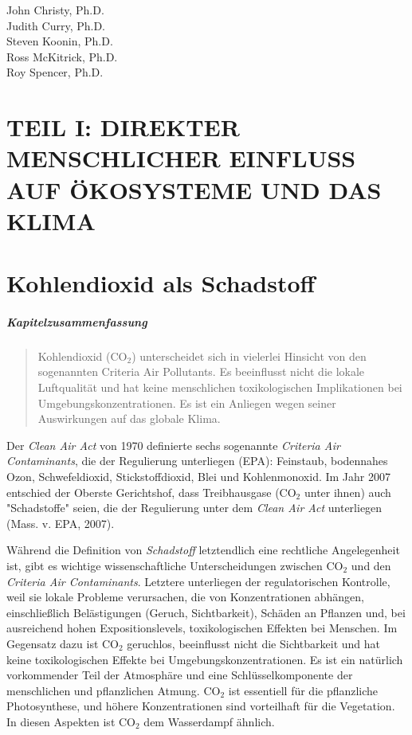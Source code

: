 \documentclass[12pt,paper=a4,DIV=12,parskip=never,chapterprefix=false,headings=standardclasses]{scrreprt}
\numberwithin{figure}{chapter}
\begin{document}
\noindent
John Christy, Ph.D.\\[1em]
Judith Curry, Ph.D.\\[1em]
Steven Koonin, Ph.D.\\[1em]
Ross McKitrick, Ph.D.\\[1em]
Roy Spencer, Ph.D.

\cleardoublepage
\chapter*{TEIL I: DIREKTER MENSCHLICHER EINFLUSS AUF ÖKOSYSTEME UND DAS KLIMA}
\cleardoublepage
{}
\chapter{Kohlendioxid als Schadstoff}
\paragraph{Kapitelzusammenfassung}
\begin{quote}
Kohlendioxid (CO$_2$) unterscheidet sich in vielerlei Hinsicht von den sogenannten Criteria Air Pollutants. Es beeinflusst nicht die lokale Luftqualität und hat keine menschlichen toxikologischen Implikationen bei Umgebungskonzentrationen. Es ist ein Anliegen wegen seiner Auswirkungen auf das globale Klima.
\end{quote}

Der \emph{Clean Air Act} von 1970 definierte sechs sogenannte \emph{Criteria Air Contaminants}, die der Regulierung unterliegen (EPA): Feinstaub, bodennahes Ozon, Schwefeldioxid, Stickstoffdioxid, Blei und Kohlenmonoxid. Im Jahr 2007 entschied der Oberste Gerichtshof, dass Treibhausgase (CO$_2$ unter ihnen) auch "Schadstoffe" seien, die der Regulierung unter dem \emph{Clean Air Act} unterliegen (Mass. v. EPA, 2007).

Während die Definition von \emph{Schadstoff} letztendlich eine rechtliche Angelegenheit ist, gibt es wichtige wissenschaftliche Unterscheidungen zwischen CO$_2$ und den \emph{Criteria Air Contaminants}. Letztere unterliegen der regulatorischen Kontrolle, weil sie lokale Probleme verursachen, die von Konzentrationen abhängen, einschließlich Belästigungen (Geruch, Sichtbarkeit), Schäden an Pflanzen und, bei ausreichend hohen Expositionslevels, toxikologischen Effekten bei Menschen. Im Gegensatz dazu ist CO$_2$ geruchlos, beeinflusst nicht die Sichtbarkeit und hat keine toxikologischen Effekte bei Umgebungskonzentrationen. Es ist ein natürlich vorkommender Teil der Atmosphäre und eine Schlüsselkomponente der menschlichen und pflanzlichen Atmung. CO$_2$ ist essentiell für die pflanzliche Photosynthese, und höhere Konzentrationen sind vorteilhaft für die Vegetation. In diesen Aspekten ist CO$_2$ dem Wasserdampf ähnlich.
\end{document}
